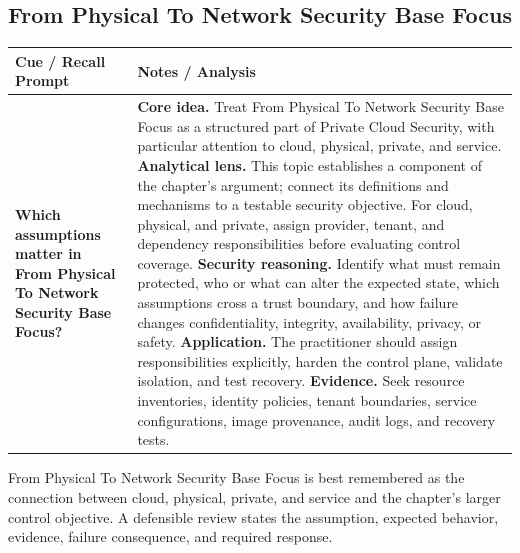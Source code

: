 \documentclass[11pt]{article}
\newcommand{\CornellHeader}{%
\rowcolor{Navy}\color{white}\bfseries Cue / Recall Prompt & \color{white}\bfseries Notes / Analysis\\\hline}
\newcommand{\CornellRow}[2]{%
\cellcolor{CueGray}\RaggedRight\textbf{#1} & \RaggedRight #2\\\hline}
\begin{document}
\subsection*{From Physical To Network Security Base Focus}
\begin{longtable}{>{\RaggedRight\arraybackslash}p{}|>{\RaggedRight\arraybackslash}p{}}
\CornellHeader
\CornellRow{Which assumptions matter in From Physical To Network Security Base Focus?}{\textbf{Core idea.} Treat From Physical To Network Security Base Focus as a structured part of Private Cloud Security, with particular attention to cloud, physical, private, and service. \textbf{Analytical lens.} This topic establishes a component of the chapter's argument; connect its definitions and mechanisms to a testable security objective. For cloud, physical, and private, assign provider, tenant, and dependency responsibilities before evaluating control coverage. \textbf{Security reasoning.} Identify what must remain protected, who or what can alter the expected state, which assumptions cross a trust boundary, and how failure changes confidentiality, integrity, availability, privacy, or safety. \textbf{Application.} The practitioner should assign responsibilities explicitly, harden the control plane, validate isolation, and test recovery. \textbf{Evidence.} Seek resource inventories, identity policies, tenant boundaries, service configurations, image provenance, audit logs, and recovery tests.}
\end{longtable}
\begin{topicsummary}
From Physical To Network Security Base Focus is best remembered as the connection between cloud, physical, private, and service and the chapter's larger control objective. A defensible review states the assumption, expected behavior, evidence, failure consequence, and required response.
\end{topicsummary}
\end{document}
